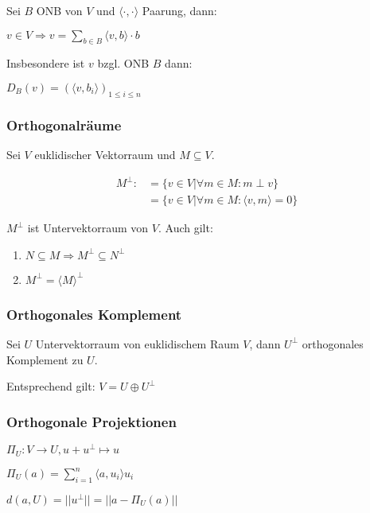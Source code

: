 Sei $B$ ONB von $V$ und $\langle \cdot, \cdot \rangle$ Paarung, dann:

$v \in V \Rightarrow v = \sum_{b\in B} \langle v, b \rangle \cdot b$

Insbesondere ist $v$ bzgl. ONB $B$ dann:

$D_B(v) = (\langle v, b_i\rangle)_{1\leq i \leq n}$

\subsubsection*{Orthogonalräume}

Sei $V$ euklidischer Vektorraum und $M \subseteq V$.

\vspace*{-2mm}
\begin{equation*}
	\begin{aligned}
		M^{\perp} :&= \{v \in V | \forall m \in M : m \perp v \} \\
		           &= \{v \in V | \forall m \in M : \langle v, m \rangle = 0\}
	\end{aligned}
\end{equation*}

$M^{\perp}$ ist Untervektorraum von $V$. Auch gilt:

\begin{enumerate}[label=(\alph*)]
	\item $N \subseteq M \Rightarrow M^{\perp} \subseteq N^{\perp}$
	\item $M^{\perp} = \langle M \rangle ^{\perp}$
\end{enumerate}

\subsubsection*{Orthogonales Komplement}

Sei $U$ Untervektorraum von euklidischem Raum $V$, dann $U^\perp$ orthogonales Komplement zu $U$.

Entsprechend gilt: $V = U \oplus U^\perp$

\subsubsection*{Orthogonale Projektionen}

\begin{description}[leftmargin=!,labelwidth=20mm]
	\item[Definition] $\Pi_U : V \rightarrow U, u + u^\perp \mapsto u$
	\item[Bestimmung] $\Pi_U(a) = \sum_{i=1}^n \langle a,u_i \rangle u_i$
	\item[Abstand]    $d(a, U) = ||u^\perp|| = ||a - \Pi_U(a)||$
\end{description}

